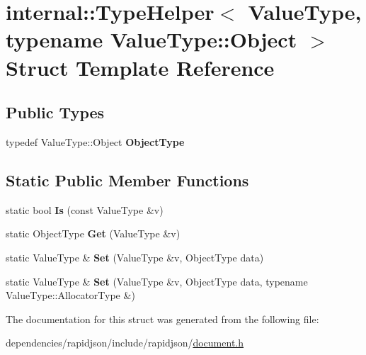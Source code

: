 \hypertarget{structinternal_1_1_type_helper_3_01_value_type_00_01typename_01_value_type_1_1_object_01_4}{}\section{internal\+:\+:Type\+Helper$<$ Value\+Type, typename Value\+Type\+:\+:Object $>$ Struct Template Reference}
\label{structinternal_1_1_type_helper_3_01_value_type_00_01typename_01_value_type_1_1_object_01_4}
\subsection*{Public Types}
\begin{DoxyCompactItemize}
\item 
\mbox{\label{structinternal_1_1_type_helper_3_01_value_type_00_01typename_01_value_type_1_1_object_01_4_ac5d59bffe76792786fd5f1ba4da94dd9}} 
typedef Value\+Type\+::\+Object {\bfseries Object\+Type}
\end{DoxyCompactItemize}
\subsection*{Static Public Member Functions}
\begin{DoxyCompactItemize}
\item 
\mbox{\label{structinternal_1_1_type_helper_3_01_value_type_00_01typename_01_value_type_1_1_object_01_4_a6c8bcb7479d2c4c96ae6dcaac808e227}} 
static bool {\bfseries Is} (const Value\+Type \&v)
\item 
\mbox{\label{structinternal_1_1_type_helper_3_01_value_type_00_01typename_01_value_type_1_1_object_01_4_ae1debd6b9c125d4206e43a74ddbd0795}} 
static Object\+Type {\bfseries Get} (Value\+Type \&v)
\item 
\mbox{\label{structinternal_1_1_type_helper_3_01_value_type_00_01typename_01_value_type_1_1_object_01_4_a7655ed9b6c7443d99063ec20769b9984}} 
static Value\+Type \& {\bfseries Set} (Value\+Type \&v, Object\+Type data)
\item 
\mbox{\label{structinternal_1_1_type_helper_3_01_value_type_00_01typename_01_value_type_1_1_object_01_4_a41825b964c6188a07539b7ab2e6ed194}} 
static Value\+Type \& {\bfseries Set} (Value\+Type \&v, Object\+Type data, typename Value\+Type\+::\+Allocator\+Type \&)
\end{DoxyCompactItemize}


The documentation for this struct was generated from the following file\+:\begin{DoxyCompactItemize}
\item 
dependencies/rapidjson/include/rapidjson/\hyperlink{document_8h}{document.\+h}\end{DoxyCompactItemize}
